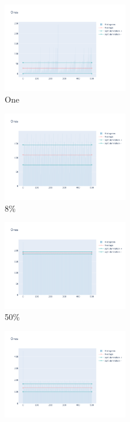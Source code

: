 \documentclass[12pt, fleqn]{report}                             %
\theoremstyle{break}                                            %
\begin{document}
      \begin{figure}[ht!]
        \centering
        \begin{subfigure}[b]{0.4\linewidth}
          \includegraphics[width=0.6\textwidth]{Images/26/dia-a.png}
          \caption{One}
        \end{subfigure}
        \begin{subfigure}[b]{0.4\linewidth}
          \includegraphics[width=0.6\textwidth]{Images/26/dia-b.png}
          \caption{8\%}
        \end{subfigure}
        \begin{subfigure}[b]{0.4\linewidth}
          \includegraphics[width=0.6\textwidth]{Images/26/dia-c.png}
          \caption{50\%}
        \end{subfigure}
        \begin{subfigure}[b]{0.4\linewidth}
          \includegraphics[width=0.6\textwidth]{Images/26/dia-d.png}

\end{subfigure}
\end{figure}
\end{document}
